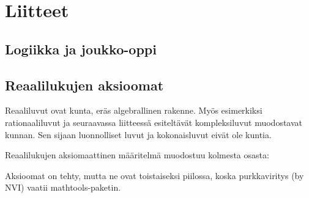 \part{Liitteet}

\chapter{Logiikka ja joukko-oppi}
\chapter{Reaalilukujen aksioomat}
Reaaliluvut ovat kunta, eräs algebrallinen rakenne. Myös esimerkiksi rationaaliluvut ja seuraavassa liitteessä esiteltävät kompleksiluvut muodostavat kunnan. Sen sijaan luonnolliset luvut ja kokonaisluvut eivät ole kuntia.

Reaalilukujen aksiomaattinen määritelmä muodostuu kolmesta osasta:

Aksioomat on tehty, mutta ne ovat toistaiseksi piilossa, koska purkkaviritys (by NVI) vaatii mathtools-paketin.


